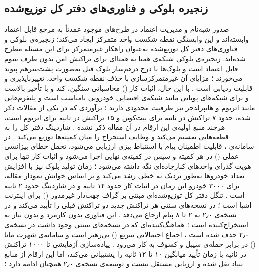 \subsection{زنجیره بلوکی و فناوری‌های دفتر کل توزیع‌شده}

صدور شبه‌نام و مدیریت اعتماد در طرح‌های موجود عمدتاً به مرجع قابل اعتماد وابسته‌اند و این وابستگی نقطه شکست واحد متمرکز ایجاد می‌کند؛ زنجیره‌ی بلوکی و فناوری‌های دفتر کل توزیع‌شده به‌عنوان راهکار غیرمتمرکز برای این مسئله مطرح شده‌اند. زنجیره‌ی بلوکی شبکه‌ی همتا به همتا‌ای برای تراکنش امن بدون طرف سوم قابل اعتماد است و بلوک‌ها با درج درهم‌ساز بلوک قبل به‌صورت پشت‌سرهم پیوند می‌خورند \cite{razaBlockchainBasedReputationTrust2024}؛ مزایای آن غیرمتمرکزسازی با حذف نقطه شکست واحد، تغییرناپذیری و قابلیت ردیابی است \cite{razaBlockchainBasedReputationTrust2024}. با این حال، اثبات کار () محاسباتی سنگین، کند و با تأخیر بالاست و برای شبکه‌های پویایی مانند شبکه‌ی اقتضایی خودرویی نامناسب است و پلتفرم‌هایی مانند اتریوم و هایپرلدجر نیز ظرفیت محدودی دارند \cite{razaBlockchainBasedReputationTrust2024}؛ برآوردی که در یکی از مقالات ذکر شده، حدود ۷ تراکنش در ثانیه برای بیت‌کوین و ۱۵ تراکنش در ثانیه برای اتریوم است، هرچند منبع اولیه‌ی این ارقام در آن مقاله ذکر نشده \cite{IOTATANGLE20}. شاردینگ دفتر کل را به قطعه‌هایی تقسیم می‌کند و وظایف استخراج را میان کمیته‌ها توزیع می‌کند \cite{ghovanlooyghajarSBTMSScalableBlockchain2021}. در سامانه‌ی ، قابلیت اطمینان پیام با استنباط بیزی ارزیابی می‌شود، تحمل خطای بیزانسی عملی () در هر کمیته و سپس در کمیته‌ی نهایی اجرا می‌شود و اثبات کار تنها برای هویت گذرای واحدهای کنارجاده‌ای نگه داشته می‌شود \cite{ghovanlooyghajarSBTMSScalableBlockchain2021}؛ زمان تولید بلوک نیز با افزایش تعداد خودروها به‌طور نزدیک به خطی رشد می‌کند و بر اساس خوانش نمودار مقاله، برای ۳۰۰۰ خودرو این زمان در اثبات کار حدود ۱۴ ثانیه و در شاردینگ حدود ۲ ثانیه است \cite{ghovanlooyghajarSBTMSScalableBlockchain2021}. تنگل  دفتر کل توزیع‌شده‌ای مبتنی بر گراف جهت‌دار غیرمدور () برای اینترنت اشیا است \cite{silvanoIotaTangleCryptocurrency2020, sealeyIOTATangle202022}؛ در نسخه‌های سنتی هر تراکنش جدید دو تراکنش قبلی را تأیید می‌کند \cite{silvanoIotaTangleCryptocurrency2020} و در نسخه‌ی ۲٫۰ به ۲ تا ۸ پیام ارجاع می‌دهد \cite{IOTATANGLE20, sealeyIOTATangle202022}. این فناوری بدون کارمزد و بدون نیاز به استخراج‌کننده است \cite{sealeyIOTATangle202022, IOTATANGLE20}؛ هماهنگ‌کننده‌ای که در نسخه‌های سنتی وجود داشت \cite{silvanoIotaTangleCryptocurrency2020} در نسخه‌ی ۲٫۰ حذف شده است \cite{IOTATANGLE20, sealeyIOTATangle202022}، اجماع احتمالاتی سریع () بی‌رهبر است \cite{sealeyIOTATangle202022} و سامانه‌ی شهرت مانا () در برابر حمله‌ی سیبل و کسوف به کار می‌رود \cite{sealeyIOTATangle202022}. پیاده‌سازی آزمایشی  تا ۱۰۰۰ تراکنش در ثانیه با زمان تأیید میانگین ۱۰ تا ۱۲ ثانیه را پشتیبانی می‌کند، اما این ارقام از منابع بنیاد  نقل شده و ارزیابی مستقل نیست \cite{sealeyIOTATangle202022} و توسعه‌ی نسخه‌ی ۲٫۰ همچنان ادامه دارد \cite{IOTATANGLE20}؛ 